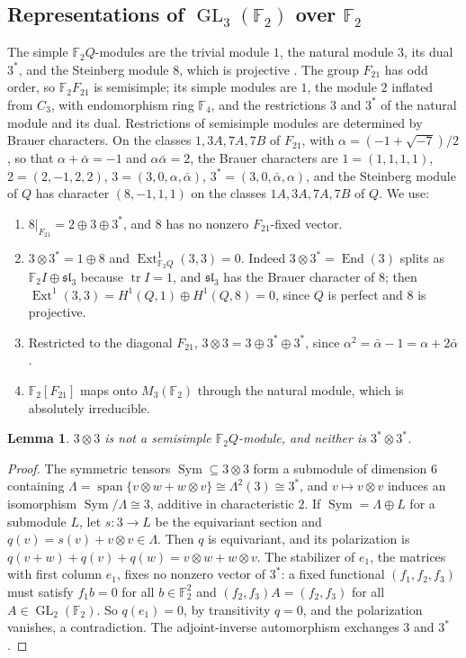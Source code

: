 \documentclass[11pt]{amsart}
\newtheorem{lemma}[theorem]{Lemma}
\theoremstyle{remark}
\newcommand{\F}{\mathbb F}
\newcommand{\GL}{\operatorname{GL}}
\newcommand{\End}{\operatorname{End}}
\begin{document}
\subsection*{Representations of $\GL_3(\F_2)$ over $\F_2$}
The simple $\F_2Q$-modules are the trivial module $1$, the natural module
$3$, its dual $3^*$, and the Steinberg module $8$, which is projective
\cite{ModularAtlas}. The group $F_{21}$ has odd order, so $\F_2F_{21}$ is
semisimple; its simple modules are $1$, the module $2$ inflated from $C_3$,
with endomorphism ring $\F_4$, and the restrictions $3$ and $3^*$ of the
natural module and its dual. Restrictions of semisimple modules are
determined by Brauer characters. On the classes $1,3A,7A,7B$ of $F_{21}$,
with $\alpha=(-1+\sqrt{-7})/2$, so that $\alpha+\bar\alpha=-1$ and
$\alpha\bar\alpha=2$, the Brauer characters are
$1=(1,1,1,1)$, $2=(2,-1,2,2)$, $3=(3,0,\alpha,\bar\alpha)$,
$3^*=(3,0,\bar\alpha,\alpha)$, and the Steinberg module of $Q$ has
character $(8,-1,1,1)$ on the classes $1A,3A,7A,7B$ of $Q$. We use:
\begin{enumerate}
\item[\textup{(F1)}] $8|_{F_{21}}=2\oplus3\oplus3^*$, and $8$ has no
nonzero $F_{21}$-fixed vector.
\item[\textup{(F2)}] $3\otimes3^*=1\oplus8$ and
$\operatorname{Ext}^1_{\F_2Q}(3,3)=0$. Indeed $3\otimes3^*=\End(3)$ splits
as $\F_2I\oplus\mathfrak{sl}_3$ because $\operatorname{tr}I=1$, and
$\mathfrak{sl}_3$ has the Brauer character of $8$; then
$\operatorname{Ext}^1(3,3)=H^1(Q,1)\oplus H^1(Q,8)=0$, since $Q$ is
perfect and $8$ is projective.
\item[\textup{(F3)}] Restricted to the diagonal $F_{21}$,
$3\otimes3=3\oplus3^*\oplus3^*$, since $\alpha^2=\bar\alpha-1=\alpha+2\bar\alpha$.
\item[\textup{(F4)}] $\F_2[F_{21}]$ maps onto $M_3(\F_2)$ through the
natural module, which is absolutely irreducible.
\end{enumerate}

\begin{lemma}\label{lem:S3}
$3\otimes3$ is not a semisimple $\F_2Q$-module, and neither is
$3^*\otimes3^*$.
\end{lemma}

\begin{proof}
The symmetric tensors $\operatorname{Sym}\subseteq3\otimes3$ form a
submodule of dimension $6$ containing
$\Lambda=\operatorname{span}\{v\otimes w+w\otimes v\}\cong\Lambda^2(3)\cong3^*$,
and $v\mapsto v\otimes v$ induces an isomorphism
$\operatorname{Sym}/\Lambda\cong3$, additive in characteristic $2$. If
$\operatorname{Sym}=\Lambda\oplus L$ for a submodule $L$, let
$s\colon3\to L$ be the equivariant section and $q(v)=s(v)+v\otimes v\in\Lambda$.
Then $q$ is equivariant, and its polarization is
$q(v+w)+q(v)+q(w)=v\otimes w+w\otimes v$. The stabilizer of $e_1$, the
matrices with first column $e_1$, fixes no nonzero vector of $3^*$: a fixed
functional $(f_1,f_2,f_3)$ must satisfy $f_1b=0$ for all $b\in\F_2^2$ and
$(f_2,f_3)A=(f_2,f_3)$ for all $A\in\GL_2(\F_2)$. So $q(e_1)=0$, by
transitivity $q=0$, and the polarization vanishes, a contradiction. The
adjoint-inverse automorphism exchanges $3$ and $3^*$.
\end{proof}
\end{document}
